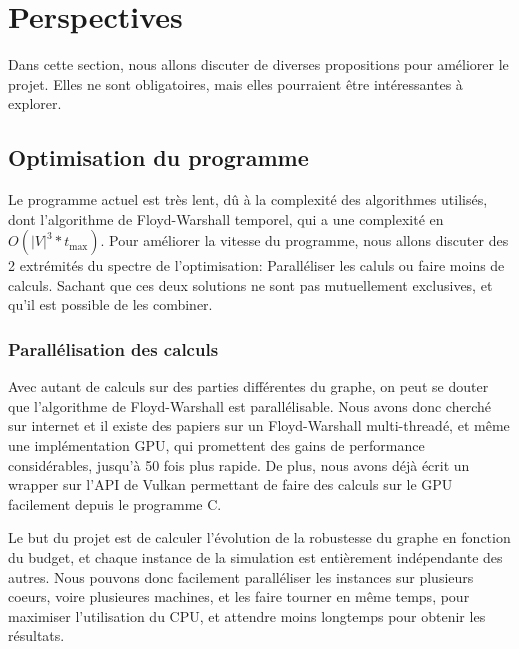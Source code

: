 \section{Perspectives}\label{sec:perspectives}
Dans cette section, nous allons discuter de diverses propositions pour améliorer le projet.
Elles ne sont obligatoires, mais elles pourraient être intéressantes à explorer.

\subsection{Optimisation du programme}\label{subsec:optimisation_du_programme}

Le programme actuel est très lent, dû à la complexité des algorithmes utilisés, dont l'algorithme de Floyd-Warshall temporel, qui a une complexité en $O(|V|^3*t_{\max})$.
Pour améliorer la vitesse du programme, nous allons discuter des 2 extrémités du spectre de l'optimisation: Paralléliser les caluls ou faire moins de calculs.
Sachant que ces deux solutions ne sont pas mutuellement exclusives, et qu'il est possible de les combiner.

\subsubsection{Parallélisation des calculs}\label{subsubsec:parallelisation}

\label{subsubsubsec:parallelisation_algorithme}
Avec autant de calculs sur des parties différentes du graphe, on peut se douter que l'algorithme de Floyd-Warshall est parallélisable.
Nous avons donc cherché sur internet et il existe des papiers sur un Floyd-Warshall multi-threadé, et même une implémentation GPU, qui promettent des gains de performance considérables, jusqu'à 50 fois plus rapide.
De plus, nous avons déjà écrit un wrapper sur l'API de Vulkan permettant de faire des calculs sur le GPU facilement depuis le programme C.

\label{subsubsubsec:parallelisation_simulations} 
Le but du projet est de calculer l'évolution de la robustesse du graphe en fonction du budget, et chaque instance de la simulation est entièrement indépendante des autres.
Nous pouvons donc facilement paralléliser les instances sur plusieurs coeurs, voire plusieures machines, et les faire tourner en même temps, pour maximiser l'utilisation du CPU, et attendre moins longtemps pour obtenir les résultats.

